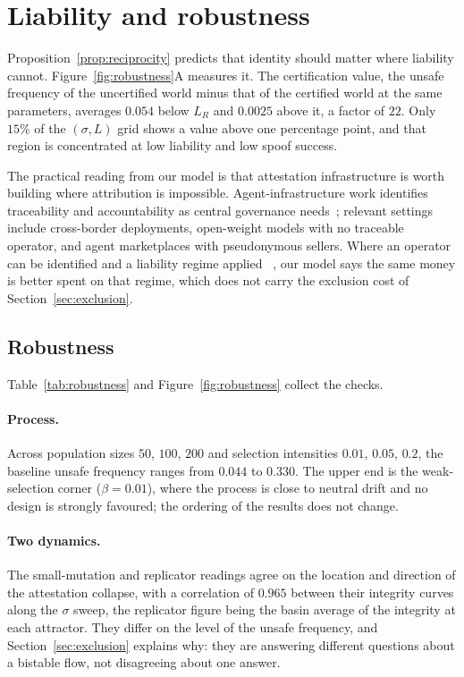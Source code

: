 \documentclass[11pt,a4paper]{article}
\begin{document}
\section{Liability and robustness}
\label{sec:liability}

Proposition~\ref{prop:reciprocity} predicts that identity should matter where
liability cannot. Figure~\ref{fig:robustness}A measures it. The certification
value, the unsafe frequency of the uncertified world minus that of the
certified world at the same parameters, averages $0.054$ below $L_R$ and
$0.0025$ above it, a factor of $22$. Only $15\%$ of the $(\sigma, L)$ grid shows
a value above one percentage point, and that region is concentrated at low
liability and low spoof success.

The practical reading from our model is that attestation infrastructure is worth
building where attribution is impossible. Agent-infrastructure work identifies
traceability and accountability as central governance
needs~\citep{chan2025infrastructure}; relevant settings include cross-border
deployments, open-weight models with no traceable operator, and agent
marketplaces with pseudonymous sellers.
Where an operator can be identified and a liability regime applied
~\citep{kolt2025governing}, our model says the same money is better spent on
that regime, which does not carry the
exclusion cost of
Section~\ref{sec:exclusion}.

\subsection{Robustness}
\label{sec:supp-robustness}

Table~\ref{tab:robustness} and Figure~\ref{fig:robustness} collect the checks.

\paragraph{Process.} Across population sizes $50$, $100$, $200$ and selection
intensities $0.01$, $0.05$, $0.2$, the baseline unsafe frequency ranges from
$0.044$ to $0.330$. The upper end is the weak-selection corner
($\beta = 0.01$), where the process is close to neutral drift and no design is
strongly favoured; the ordering of the results does not change.

\paragraph{Two dynamics.} The small-mutation and replicator readings agree on
the location and direction of the attestation collapse, with a correlation of
$0.965$ between their integrity curves along the $\sigma$ sweep, the replicator
figure being the basin average of the integrity at each attractor. They differ
on the level of the unsafe frequency, and Section~\ref{sec:exclusion} explains
why: they are answering different questions about a bistable flow, not
disagreeing about one answer.
\end{document}
